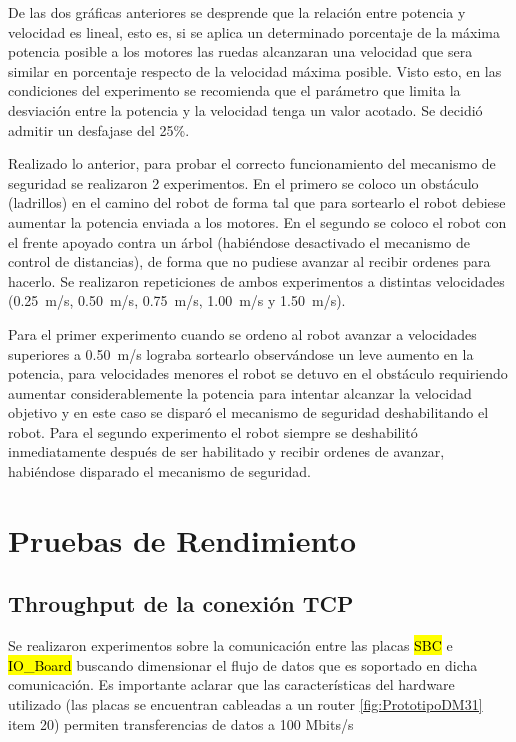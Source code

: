 \documentclass[withindex,glossary]{cam-thesis}
\begin{document}
De las dos gráficas anteriores se desprende que la relación entre potencia y velocidad es lineal, esto es, si se aplica un determinado porcentaje de la máxima potencia posible a los motores las ruedas alcanzaran una velocidad que sera similar en porcentaje respecto de la velocidad máxima posible. Visto esto, en las condiciones del experimento se recomienda que el parámetro que limita la desviación entre la potencia y la velocidad tenga un valor acotado. Se decidió admitir un desfajase del 25\%.

Realizado lo anterior, para probar el correcto funcionamiento del mecanismo de seguridad se realizaron 2 experimentos. En el primero se coloco un obstáculo (ladrillos) en el camino del robot de forma tal que para sortearlo el robot debiese aumentar la potencia enviada a los motores. En el segundo se coloco el robot con el frente apoyado contra un árbol (habiéndose desactivado el mecanismo de control de distancias), de forma que no pudiese avanzar al recibir ordenes para hacerlo. Se realizaron repeticiones de ambos experimentos a distintas velocidades (\SI{0.25}{\metre/\second}, \SI{0.50}{\metre/\second}, \SI{0.75}{\metre/\second}, \SI{1.00}{\metre/\second} y \SI{1.50}{\metre/\second}).

Para el primer experimento cuando se ordeno al robot avanzar a velocidades superiores a \SI{0.50}{\metre/\second} lograba sortearlo observándose un leve aumento en la potencia, para velocidades menores el robot se detuvo en el obstáculo requiriendo aumentar considerablemente la potencia para intentar alcanzar la velocidad objetivo y en este caso se disparó el mecanismo de seguridad deshabilitando el robot. Para el segundo experimento el robot siempre se deshabilitó inmediatamente después de ser habilitado y recibir ordenes de avanzar, habiéndose disparado el mecanismo de seguridad.

\section{Pruebas de Rendimiento}
\subsection{Throughput de la conexión TCP}
Se realizaron experimentos sobre la comunicación entre las placas \hl{SBC} e \hl{IO\_Board} buscando dimensionar el flujo de datos que es soportado en dicha comunicación. Es importante aclarar que las características del hardware utilizado (las placas se encuentran cableadas a un router \ref{fig:PrototipoDM31} item 20) permiten transferencias de datos a 100 Mbits/s 
\end{document}
